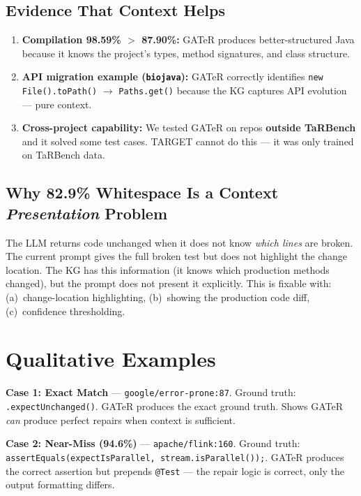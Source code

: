 \documentclass[11pt,a4paper]{article}
\begin{document}
\subsection{Evidence That Context Helps}

\begin{enumerate}[nosep,leftmargin=1.5em]
  \item \textbf{Compilation 98.59\% $>$ 87.90\%:}
        GATeR produces better-structured Java because it knows the
        project's types, method signatures, and class structure.
  \item \textbf{API migration example (\texttt{biojava}):}
        GATeR correctly identifies \texttt{new File().toPath()}
        $\to$ \texttt{Paths.get()} because the KG captures API
        evolution --- pure context.
  \item \textbf{Cross-project capability:}
        We tested GATeR on repos \textbf{outside TaRBench} and it
        solved some test cases.  TARGET cannot do this --- it was only
        trained on TaRBench data.
\end{enumerate}

\subsection{Why 82.9\% Whitespace Is a Context \textit{Presentation} Problem}

The LLM returns code unchanged when it does not know \textit{which lines}
are broken.  The current prompt gives the full broken test but does not
highlight the change location.  The KG has this information (it knows
which production methods changed), but the prompt does not present it
explicitly.  This is fixable with:
(a)~change-location highlighting,
(b)~showing the production code diff,
(c)~confidence thresholding.

\section{Qualitative Examples}

\textbf{Case 1: Exact Match} ---
\texttt{google/error-prone:87}.  Ground truth: \texttt{.expectUnchanged()}.
GATeR produces the exact ground truth.  Shows GATeR \textit{can}
produce perfect repairs when context is sufficient.

\textbf{Case 2: Near-Miss (94.6\%)} ---
\texttt{apache/flink:160}.  Ground truth:
\texttt{assertEquals(expectIsParallel, stream.isParallel());}.
GATeR produces the correct assertion but prepends \texttt{@Test} ---
the repair logic is correct, only the output formatting differs.
\end{document}
